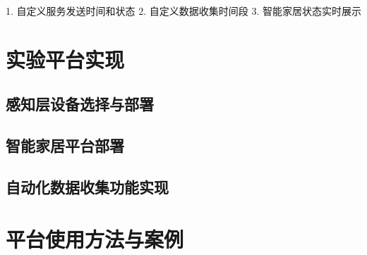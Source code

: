 1. 自定义服务发送时间和状态
2. 自定义数据收集时间段
3. 智能家居状态实时展示

\section{实验平台实现}

\subsection{感知层设备选择与部署}

\subsection{智能家居平台部署}

\subsection{自动化数据收集功能实现}

\section{平台使用方法与案例}
